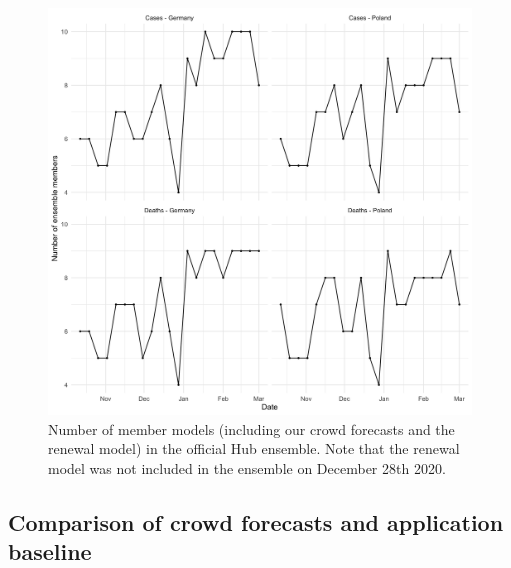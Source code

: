 \documentclass[10pt,letterpaper]{article}
\begin{document}
\begin{figure}[H]
\includegraphics[width=1\linewidth,]{../analysis/plots/ensemble-members} \caption{Number of member models (including our crowd forecasts and the renewal model) in the official Hub ensemble. Note that the renewal model was not included in the ensemble on December 28th 2020.}\label{fig:num-ensemble-members}
\end{figure}

\clearpage

\hypertarget{comparison-of-crowd-forecasts-and-application-baseline}{%
\subsection{Comparison of crowd forecasts and application
baseline}\label{comparison-of-crowd-forecasts-and-application-baseline}}
\end{document}
